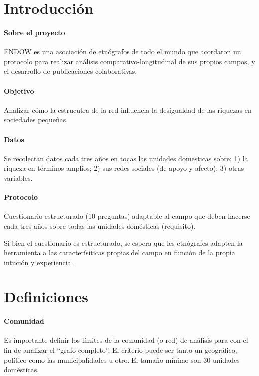 \documentclass[a4paper,10pt]{article}
\title{}
\author{}
\theoremstyle{definition}
\begin{document}
\maketitle

\section{Introducción}

\paragraph{Sobre el proyecto} ENDOW es una asociación de etnógrafos de todo el mundo que acordaron un protocolo para realizar análisis comparativo-longitudinal de sus propios campos, y el desarrollo de publicaciones colaborativas.

\paragraph{Objetivo} Analizar cómo la estrucutra de la red influencia la desigualdad de las riquezas en sociedades pequeñas.

\paragraph{Datos} Se recolectan datos cada tres años en todas las unidades domesticas sobre: 1) la riqueza en términos amplios; 2) sus redes sociales (de apoyo y afecto); 3) otras variables.

\paragraph{Protocolo} Cuestionario estructurado (10 preguntas) adaptable al campo que deben hacerse cada tres años sobre todas las unidades domésticas (requisito).

\vspace{0.1cm}

Si bien el cuestionario es estructurado, se espera que les etnógrafes adapten la herramienta a las caracterísiticas propias del campo en función de la propia intución y experiencia.

\section{Definiciones}

\paragraph{Comunidad} Es importante definir los límites de la comunidad (o red) de análisis para con el fin de analizar el ``grafo completo''. El criterio puede ser tanto un geográfico, político como las municipalidades u otro. El tamaño mínimo son 30 unidades domésticas.
\end{document}
